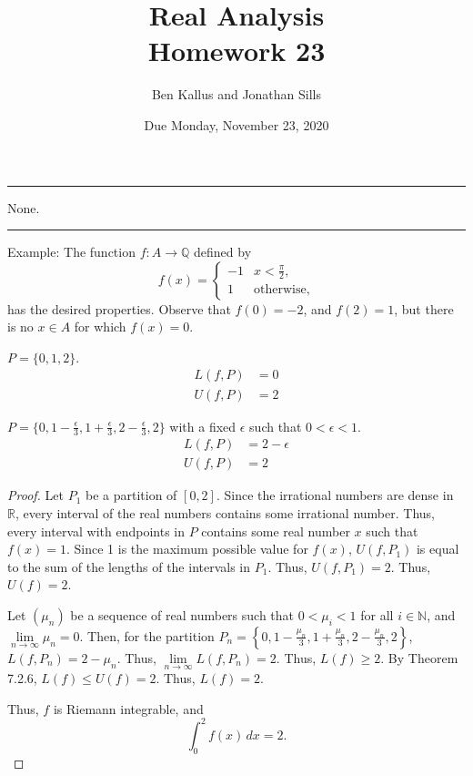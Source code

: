 \documentclass[12pt]{article}
\title{Real Analysis \\ Homework 23}
\author{Ben Kallus and Jonathan Sills}
\date{Due Monday, November 23, 2020}
\begin{document}
\pagecolor{black}
\color{white}
\maketitle

\hrule
\bigskip

 None.

\bigskip
\hrule
\bigskip

 Example: The function $f: A \to \mathbb Q$ defined by $$f(x) = \begin{cases} -1 & x < \frac\pi2, \\ 1 & \text{otherwise,} \end{cases}$$ has the desired properties. Observe that $f(0) = -2$, and $f(2) = 1$, but there is no $x \in A$ for which $f(x) = 0$.

\newpage
{}

\medskip
{} $P = \{0,1,2\}$.
\begin{align*}
    L(f, P) &= 0 \\
    U(f, P) &= 2
\end{align*}

\medskip
{} $P = \{0, 1 - \frac\epsilon3, 1 + \frac\epsilon3, 2 - \frac\epsilon3, 2\}$ with a fixed $\epsilon$ such that $0 < \epsilon < 1$.
\begin{align*}
    L(f, P) &= 2 - \epsilon \\
    U(f, P) &= 2
\end{align*}

\medskip
{}
\begin{proof}
    Let $P_1$ be a partition of $[0,2]$.
    Since the irrational numbers are dense in $\mathbb R$, every interval of the real numbers contains some irrational number.
    Thus, every interval with endpoints in $P$ contains some real number $x$ such that $f(x) = 1$.
    Since 1 is the maximum possible value for $f(x)$, $U(f, P_1)$ is equal to the sum of the lengths of the intervals in $P_1$.
    Thus, $U(f,P_1) = 2$.
    Thus, $U(f) = 2$.

    Let $(\mu_n)$ be a sequence of real numbers such that $0 < \mu_i < 1$ for all $i \in \mathbb N$, and $\lim\limits_{n \to \infty} \mu_n = 0$.
    Then, for the partition $P_n = \left\{0, 1 - \frac{\mu_n}3, 1 + \frac{\mu_n}3, 2 - \frac{\mu_n}3, 2 \right\}$, $L(f, P_n) = 2 - \mu_n$.
    Thus, $\lim\limits_{n\to\infty}L(f, P_n) = 2$.
    Thus, $L(f) \geq 2$.
    By Theorem 7.2.6, $L(f) \leq U(f) = 2$.
    Thus, $L(f) = 2$.

    Thus, $f$ is Riemann integrable, and $$\int_0^2 f(x) \,dx = 2.$$
\end{proof}
\end{document}
